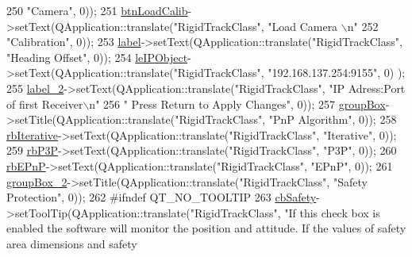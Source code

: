 \begin{DoxyCode}
250 \textcolor{stringliteral}{"Camera"}, 0));
251         \hyperlink{class_ui___rigid_track_class_aafe138bcd4b21e4608ab39f76ca6e042}{btnLoadCalib}->setText(QApplication::translate(\textcolor{stringliteral}{"RigidTrackClass"}, \textcolor{stringliteral}{"Load Camera \(\backslash\)n"}
252 \textcolor{stringliteral}{"Calibration"}, 0));
253         \hyperlink{class_ui___rigid_track_class_a2de57788f55b334c451dc9d0449b104c}{label}->setText(QApplication::translate(\textcolor{stringliteral}{"RigidTrackClass"}, \textcolor{stringliteral}{"Heading Offset"}, 0));
254         \hyperlink{class_ui___rigid_track_class_a8372ffd3f54aa2672228e28e48fe18f3}{leIPObject}->setText(QApplication::translate(\textcolor{stringliteral}{"RigidTrackClass"}, \textcolor{stringliteral}{"192.168.137.254:9155"}, 0)
      );
255         \hyperlink{class_ui___rigid_track_class_adad99dbe226b6a900918729abb37a6b8}{label\_2}->setText(QApplication::translate(\textcolor{stringliteral}{"RigidTrackClass"}, \textcolor{stringliteral}{"IP Adress:Port of first
       Receiver\(\backslash\)n"}
256 \textcolor{stringliteral}{" Press Return to Apply Changes"}, 0));
257         \hyperlink{class_ui___rigid_track_class_a895128ce9cc7dda6c57b654512e12e7d}{groupBox}->setTitle(QApplication::translate(\textcolor{stringliteral}{"RigidTrackClass"}, \textcolor{stringliteral}{"PnP Algorithm"}, 0));
258         \hyperlink{class_ui___rigid_track_class_a7ee2c6448b82ecb455b4f6122ea8dbeb}{rbIterative}->setText(QApplication::translate(\textcolor{stringliteral}{"RigidTrackClass"}, \textcolor{stringliteral}{"Iterative"}, 0));
259         \hyperlink{class_ui___rigid_track_class_a3f20a41a0b0d35ff5a077530743c82c9}{rbP3P}->setText(QApplication::translate(\textcolor{stringliteral}{"RigidTrackClass"}, \textcolor{stringliteral}{"P3P"}, 0));
260         \hyperlink{class_ui___rigid_track_class_a1c45060b8c85c0e4cfe4a7c1e40f203a}{rbEPnP}->setText(QApplication::translate(\textcolor{stringliteral}{"RigidTrackClass"}, \textcolor{stringliteral}{"EPnP"}, 0));
261         \hyperlink{class_ui___rigid_track_class_a85d7c172656cb175131c5da83caf6a48}{groupBox\_2}->setTitle(QApplication::translate(\textcolor{stringliteral}{"RigidTrackClass"}, \textcolor{stringliteral}{"Safety Protection"}, 0));
262 \textcolor{preprocessor}{#ifndef QT\_NO\_TOOLTIP}
263         \hyperlink{class_ui___rigid_track_class_a44e812df547a219bdf2b43383a4e849b}{cbSafety}->setToolTip(QApplication::translate(\textcolor{stringliteral}{"RigidTrackClass"}, \textcolor{stringliteral}{"If this check box is
       enabled the software will monitor the position and attitude. If the values of safety area dimensions and safety
}
\end{DoxyCode}
